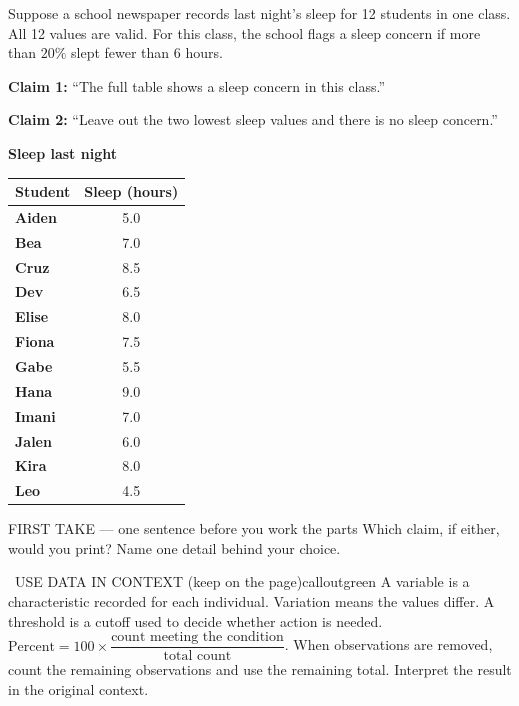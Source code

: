 \documentclass[11pt]{article}
\begin{document}


Suppose a school newspaper records last night's sleep for 12 students in one class. All 12 values are valid. For this class, the school flags a sleep concern if more than $20\%$ slept fewer than 6 hours.\par\smallskip \textbf{Claim 1:} ``The full table shows a sleep concern in this class.''\par \textbf{Claim 2:} ``Leave out the two lowest sleep values and there is no sleep concern.''\par
\begin{center}
\textbf{Sleep last night}\par\smallskip
\begin{tabular}{|l|c|}
\hline
\textbf{Student} & \textbf{Sleep (hours)} \\ \hline
\textbf{Aiden} & 5.0 \\ \hline
\textbf{Bea} & 7.0 \\ \hline
\textbf{Cruz} & 8.5 \\ \hline
\textbf{Dev} & 6.5 \\ \hline
\textbf{Elise} & 8.0 \\ \hline
\textbf{Fiona} & 7.5 \\ \hline
\textbf{Gabe} & 5.5 \\ \hline
\textbf{Hana} & 9.0 \\ \hline
\textbf{Imani} & 7.0 \\ \hline
\textbf{Jalen} & 6.0 \\ \hline
\textbf{Kira} & 8.0 \\ \hline
\textbf{Leo} & 4.5 \\ \hline
\end{tabular}
\end{center}
\begin{firsttakebox}{FIRST TAKE --- one sentence before you work the parts}
Which claim, if either, would you print? Name one detail behind your choice.
\workspace{0.9in}
\end{firsttakebox}

\begin{callout}{\IconBook\ USE DATA IN CONTEXT (keep on the page)}{calloutgreen}
A variable is a characteristic recorded for each individual. Variation means the values differ. A threshold is a cutoff used to decide whether action is needed. $\text{Percent}=100\times\dfrac{\text{count meeting the condition}}{\text{total count}}$. When observations are removed, count the remaining observations and use the remaining total. Interpret the result in the original context.
\end{callout}
\end{document}
